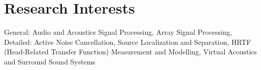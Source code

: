 \documentclass[11pt]{article}
\begin{document}
\section*{Research Interests}
General: Audio and Acoustics Signal Processing, Array Signal Processing, \\
Detailed: Active Noise Cancellation, Source Localization and Separation, HRTF (Head-Related Transfer Function) Measurement and Modelling, Virtual Acoustics and Surround Sound Systems

%

\end{document}
